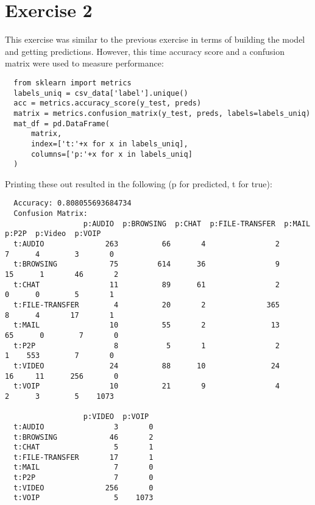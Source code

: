 \documentclass[11pt]{article}
\begin{document}
\section*{Exercise 2}
This exercise was similar to the previous exercise in terms of building the model and getting predictions. However, this time accuracy score and a confusion
matrix were used to measure performance:
\begin{verbatim}
  from sklearn import metrics
  labels_uniq = csv_data['label'].unique()
  acc = metrics.accuracy_score(y_test, preds)
  matrix = metrics.confusion_matrix(y_test, preds, labels=labels_uniq)
  mat_df = pd.DataFrame(
      matrix,
      index=['t:'+x for x in labels_uniq],
      columns=['p:'+x for x in labels_uniq]
  )
\end{verbatim}
Printing these out resulted in the following (p for predicted, t for true):
\begin{verbatim}
  Accuracy: 0.808055693684734
  Confusion Matrix:
                  p:AUDIO  p:BROWSING  p:CHAT  p:FILE-TRANSFER  p:MAIL  p:P2P  p:Video  p:VOIP
  t:AUDIO              263          66       4                2       7      4        3       0
  t:BROWSING            75         614      36                9      15      1       46       2
  t:CHAT                11          89      61                2       0      0        5       1
  t:FILE-TRANSFER        4          20       2              365       8      4       17       1
  t:MAIL                10          55       2               13      65      0        7       0
  t:P2P                  8           5       1                2       1    553        7       0
  t:VIDEO               24          88      10               24      16     11      256       0
  t:VOIP                10          21       9                4       2      3        5    1073

                  p:VIDEO  p:VOIP  
  t:AUDIO                3       0  
  t:BROWSING            46       2  
  t:CHAT                 5       1  
  t:FILE-TRANSFER       17       1  
  t:MAIL                 7       0  
  t:P2P                  7       0  
  t:VIDEO              256       0  
  t:VOIP                 5    1073  
\end{verbatim}



\end{document}
